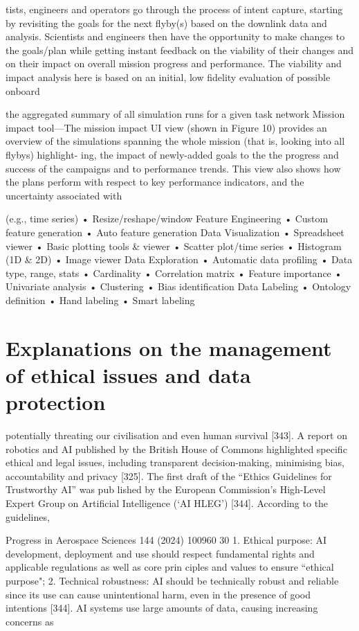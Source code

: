 \documentclass[a4paper,12pt]{article}
\begin{document}
tists, engineers and operators go through the process of intent
capture, starting by revisiting the goals for the next ﬂyby(s)
based on the downlink data and analysis.
Scientists and
engineers then have the opportunity to make changes to the
goals/plan while getting instant feedback on the viability of
their changes and on their impact on overall mission progress
and performance. The viability and impact analysis here is
based on an initial, low ﬁdelity evaluation of possible onboard

the aggregated summary of all simulation runs for a given
task network
Mission impact tool—The mission impact UI view (shown in
Figure 10) provides an overview of the simulations spanning
the whole mission (that is, looking into all ﬂybys) highlight-
ing, the impact of newly-added goals to the the progress and
success of the campaigns and to performance trends. This
view also shows how the plans perform with respect to key
performance indicators, and the uncertainty associated with

(e.g., time series)
• Resize/reshape/window
Feature Engineering
• Custom feature generation
• Auto feature generation
Data Visualization
• Spreadsheet viewer
• Basic plotting tools & viewer
• Scatter plot/time series
• Histogram (1D & 2D)
• Image viewer
Data Exploration
• Automatic data profiling
• Data type, range, stats
• Cardinality
• Correlation matrix
• Feature importance
• Univariate analysis
• Clustering
• Bias identification
Data Labeling
• Ontology definition
• Hand labeling
• Smart labeling

\section{Explanations on the management of ethical issues and data protection}

potentially threating our civilisation and even human survival [343]. A 
report on robotics and AI published by the British House of Commons 
highlighted specific ethical and legal issues, including transparent 
decision-making, minimising bias, accountability and privacy [325]. 
The first draft of the “Ethics Guidelines for Trustworthy AI” was pub­
lished by the European Commission’s High-Level Expert Group on 
Artificial Intelligence (‘AI HLEG’) [344]. According to the guidelines,

Progress in Aerospace Sciences 144 (2024) 100960
30
1. Ethical purpose: AI development, deployment and use should respect 
fundamental rights and applicable regulations as well as core prin­
ciples and values to ensure “ethical purpose";  
2. Technical robustness: AI should be technically robust and reliable 
since its use can cause unintentional harm, even in the presence of 
good intentions [344]. 
AI systems use large amounts of data, causing increasing concerns as
\end{document}
